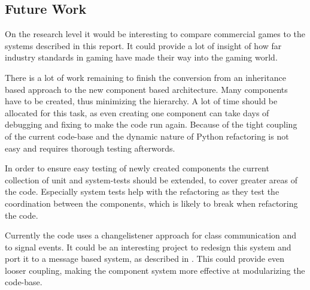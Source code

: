\subsection{Future Work}
On the research level it would be interesting to compare commercial games to the \OS{} systems described in this
report. It could provide a lot of insight of how far industry standards in gaming have made their way into the \OS{}
gaming world.

There is a lot of work remaining to finish the conversion from an inheritance based approach to the new component based
architecture. Many components have to be created, thus minimizing the hierarchy. A lot of time should be allocated for
this task, as even creating one component can take days of debugging and fixing to make the code run again. Because of
the tight coupling of the current code-base and the dynamic nature of Python refactoring is not easy and requires
thorough testing afterwords.

In order to ensure easy testing of newly created components the current collection of unit and system-tests should be
extended, to cover greater areas of the code. Especially system tests help with the refactoring as they test the
coordination between the components, which is likely to break when refactoring the code.

Currently the code uses a changelistener approach for class communication and to signal events. It could be an
interesting project to redesign this system and port it to a message based system, as described in \cite{Fh02ageneric}.
This could provide even looser coupling, making the component system more effective at modularizing the code-base.

